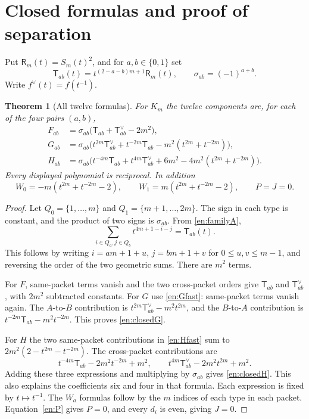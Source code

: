 \documentclass[12pt]{amsart}
\newtheorem{thm}{Theorem}[section]
\theoremstyle{definition}
\theoremstyle{remark}
\numberwithin{equation}{section}
\newcommand{\RR}{\mathsf R}
\newcommand{\TT}{\mathsf T}
\begin{document}
\section{Closed formulas and proof of separation}
Put $\RR_m(t)=S_m(t)^2$, and for $a,b\in\{0,1\}$ set
\[
\TT_{ab}(t)=t^{(2-a-b)m+1}\RR_m(t),\qquad \sigma_{ab}=(-1)^{a+b}.
\]
Write $f^\vee(t)=f(t^{-1})$.
\begin{thm}[All twelve formulas]\label{en:closed}
For $K_m$ the twelve components are, for each of the four pairs $(a,b)$,
\begin{align}
F_{ab}&=\sigma_{ab}\bigl(\TT_{ab}+\TT_{ab}^\vee-2m^2\bigr),\label{en:closedF}\\
G_{ab}&=\sigma_{ab}\bigl(t^{2m}\TT_{ab}^\vee+t^{-2m}\TT_{ab}
-m^2(t^{2m}+t^{-2m})\bigr),\label{en:closedG}\\
H_{ab}&=\sigma_{ab}\bigl(t^{-4m}\TT_{ab}+t^{4m}\TT_{ab}^\vee
+6m^2-4m^2(t^{2m}+t^{-2m})\bigr).\label{en:closedH}
\end{align}
Every displayed polynomial is reciprocal. In addition
\begin{equation}\label{en:familyW}
W_0=-m(t^{2m}+t^{-2m}-2),\qquad
W_1=m(t^{2m}+t^{-2m}-2),\qquad P=J=0.
\end{equation}
\end{thm}
\begin{proof}
Let $Q_0=\{1,\ldots,m\}$ and $Q_1=\{m+1,\ldots,2m\}$.
The sign in each type is constant, and the product of two signs is
$\sigma_{ab}$. From \eqref{en:familyA},
\[
\sum_{i\in Q_a,j\in Q_b}t^{4m+1-i-j}=\TT_{ab}(t).
\]
This follows by writing $i=am+1+u$, $j=bm+1+v$ for
$0\le u,v\le m-1$, and reversing the order of the two geometric sums.
There are $m^2$ terms.

For $F$, same-packet terms vanish and the two cross-packet orders give
$\TT_{ab}$ and $\TT_{ab}^\vee$, with $2m^2$ subtracted constants.
For $G$ use \eqref{en:Gfast}: same-packet terms vanish again. The
$A$-to-$B$ contribution is $t^{2m}\TT_{ab}^\vee-m^2t^{2m}$,
and the $B$-to-$A$ contribution is
$t^{-2m}\TT_{ab}-m^2t^{-2m}$. This proves \eqref{en:closedG}.

For $H$ the two same-packet contributions in \eqref{en:Hfast} sum to
$2m^2(2-t^{2m}-t^{-2m})$. The cross-packet contributions are
\[
t^{-4m}\TT_{ab}-2m^2t^{-2m}+m^2,\qquad
t^{4m}\TT_{ab}^\vee-2m^2t^{2m}+m^2.
\]
Adding these three expressions and multiplying by $\sigma_{ab}$ gives
\eqref{en:closedH}. This also explains the coefficients six and four
in that formula. Each expression is fixed by $t\mapsto t^{-1}$.
The $W_a$ formulas follow by the $m$ indices of each type in each packet.
Equation~\eqref{en:P} gives $P=0$, and every $d_i$ is even, giving $J=0$.
\end{proof}
\end{document}

